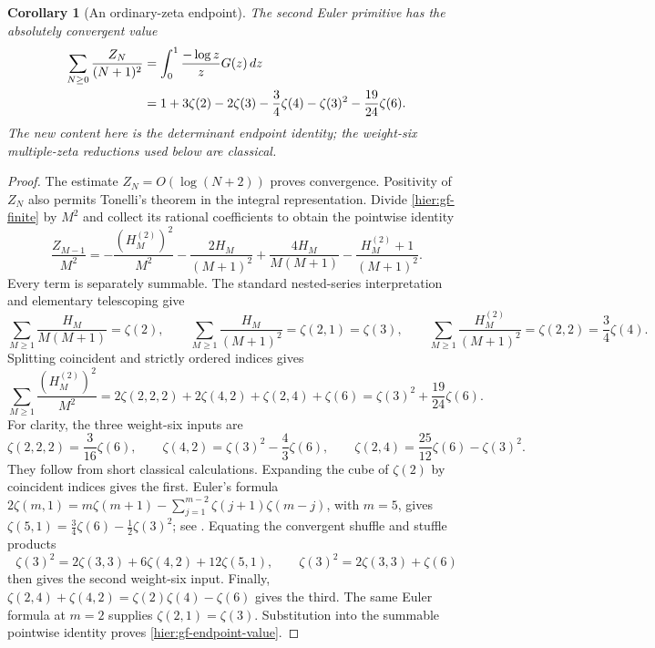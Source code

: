 \documentclass[11pt]{article}
\newtheorem{corollary}[theorem]{Corollary}
\theoremstyle{definition}
\theoremstyle{remark}
\numberwithin{equation}{section}
\begin{document}
\begin{corollary}[An ordinary-zeta endpoint]
\label{hier:gf-endpoint}
The second Euler primitive has the absolutely convergent value
\begin{align}\label{hier:gf-endpoint-value}
 \sum_{N\ge0}\frac{Z_N}{(N+1)^2}
 &=\int_0^1\frac{-\log z}{z}G(z)\,dz\notag\\
 &=1+3\zeta(2)-2\zeta(3)-\frac34\zeta(4)
                     -\zeta(3)^2-\frac{19}{24}\zeta(6).
\end{align}
The new content here is the determinant endpoint identity; the
weight-six multiple-zeta reductions used below are classical.
\end{corollary}
\begin{proof}
The estimate $Z_N=O(\log(N+2))$ proves convergence.  Positivity of
$Z_N$ also permits Tonelli's theorem in the integral representation.
Divide \eqref{hier:gf-finite} by $M^2$ and collect its rational
coefficients to obtain the pointwise identity
\[
 \frac{Z_{M-1}}{M^2}
 =-\frac{(H_M^{(2)})^2}{M^2}
  -\frac{2H_M}{(M+1)^2}
  +\frac{4H_M}{M(M+1)}
  -\frac{H_M^{(2)}+1}{(M+1)^2}.
\]
Every term is separately summable.  The standard nested-series
interpretation and elementary telescoping give
\[
 \sum_{M\ge1}\frac{H_M}{M(M+1)}=\zeta(2),\qquad
 \sum_{M\ge1}\frac{H_M}{(M+1)^2}=\zeta(2,1)=\zeta(3),
 \qquad
 \sum_{M\ge1}\frac{H_M^{(2)}}{(M+1)^2}=\zeta(2,2)=\frac34\zeta(4).
\]
Splitting coincident and strictly ordered indices gives
\begin{equation}\label{hier:gf-square-Euler}
 \sum_{M\ge1}\frac{(H_M^{(2)})^2}{M^2}
 =2\zeta(2,2,2)+2\zeta(4,2)+\zeta(2,4)+\zeta(6)
 =\zeta(3)^2+\frac{19}{24}\zeta(6).
\end{equation}
For clarity, the three weight-six inputs are
\[
 \zeta(2,2,2)=\frac3{16}\zeta(6),\qquad
 \zeta(4,2)=\zeta(3)^2-\frac43\zeta(6),\qquad
 \zeta(2,4)=\frac{25}{12}\zeta(6)-\zeta(3)^2.
\]
They follow from short classical calculations.  Expanding the cube
of $\zeta(2)$ by coincident indices gives the first.  Euler's formula
$2\zeta(m,1)=m\zeta(m+1)-\sum_{j=1}^{m-2}
\zeta(j+1)\zeta(m-j)$, with $m=5$, gives
$\zeta(5,1)=\tfrac34\zeta(6)-\tfrac12\zeta(3)^2$;
see \cite[Eq.~(1.3)]{hier:BB2005}.  Equating the convergent shuffle
and stuffle products
\[
 \zeta(3)^2=2\zeta(3,3)+6\zeta(4,2)+12\zeta(5,1),
 \qquad
 \zeta(3)^2=2\zeta(3,3)+\zeta(6)
\]
then gives the second weight-six input.  Finally,
$\zeta(2,4)+\zeta(4,2)=\zeta(2)\zeta(4)-\zeta(6)$ gives the third.
The same Euler formula at $m=2$ supplies $\zeta(2,1)=\zeta(3)$.
Substitution into the summable pointwise identity proves
\eqref{hier:gf-endpoint-value}.
\end{proof}
\end{document}
